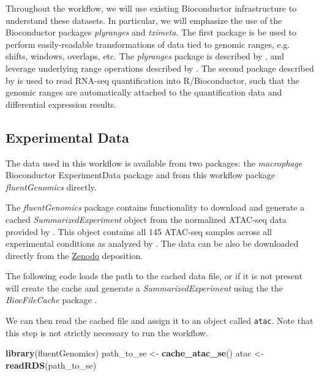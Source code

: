 \documentclass[
  9pt,
  a4paper,
]{extarticle}
\newenvironment{Shaded}{\begin{snugshade}}{\end{snugshade}}
\newcommand{\KeywordTok}[1]{\textcolor[rgb]{0.13,0.29,0.53}{\textbf{#1}}}
\newcommand{\NormalTok}[1]{#1}
\newcommand{\StringTok}[1]{\textcolor[rgb]{0.31,0.60,0.02}{#1}}
\begin{document}
Throughout the workflow, we will use existing Bioconductor infrastructure to
understand these datasets. In particular, we will emphasize the use of the
Bioconductor packages \emph{plyranges} and \emph{tximeta}. The first package is be used
to perform easily-readable transformations of data tied to genomic ranges, e.g.
shifts, windows, overlaps, etc. The \emph{plyranges} package is described by
\citet{Lee2019}, and leverage underlying range operations described by \citet{granges}. The
second package described by \citet{Love2019-tximeta} is used to read RNA-seq
quantification into R/Bioconductor, such that the genomic ranges are
automatically attached to the quantification data and differential expression
results.

\hypertarget{experimental-data}{%
\subsection{Experimental Data}\label{experimental-data}}

The data used in this workflow is available from two packages: the \emph{macrophage}
Bioconductor ExperimentData package and from this workflow package
\emph{fluentGenomics} directly.

The \emph{fluentGenomics} package contains functionality to download and generate a
cached \emph{SummarizedExperiment} object from the normalized ATAC-seq data provided
by \citet{alasooZenodo}. This object contains all 145 ATAC-seq samples across all
experimental conditions as analyzed by \citet{alasoo}. The data can be also be
downloaded directly from the
\href{https://zenodo.org/record/1188300\#.XIAhXlNKjOQ}{Zenodo} deposition.

The following code loads the path to the cached data file, or if it is not
present will create the cache and generate a \emph{SummarizedExperiment} using the
the \emph{BiocFileCache} package \citep{bcfilecache}.

We can then read the cached file and assign it to an object called \texttt{atac}. Note
that this step is not strictly necessary to run the workflow.

\begin{Shaded}
\begin{Highlighting}[]
\KeywordTok{library}\NormalTok{(fluentGenomics)}
\NormalTok{path_to_se <-}\StringTok{ }\KeywordTok{cache_atac_se}\NormalTok{()}
\NormalTok{atac <-}\StringTok{ }\KeywordTok{readRDS}\NormalTok{(path_to_se)}
\end{Highlighting}
\end{Shaded}
\end{document}
